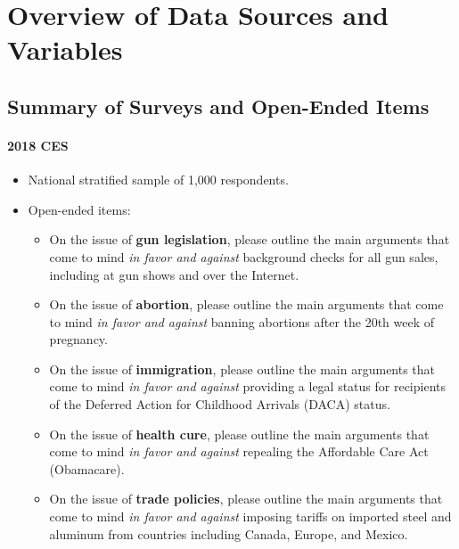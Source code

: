 \section{Overview of Data Sources and Variables}\label{app:variables}

\subsection{Summary of Surveys and Open-Ended Items}

\paragraph{2018 CES}

\begin{itemize}
	\item National stratified sample of 1,000 respondents.
	\item Open-ended items:
	\begin{itemize}
		\item On the issue of \textbf{gun legislation}, please outline the main arguments that come to mind \textit{in favor and against} background checks for all gun sales, including at gun shows and over the Internet.
		\item On the issue of \textbf{abortion}, please outline the main arguments that come to mind \textit{in favor and against} banning abortions after the 20th week of pregnancy.
		\item On the issue of \textbf{immigration}, please outline the main arguments that come to mind \textit{in favor and against} providing a legal status for recipients of the Deferred Action for Childhood Arrivals (DACA) status.
		\item On the issue of \textbf{health cure}, please outline the main arguments that come to mind \textit{in favor and against} repealing the Affordable Care Act (Obamacare).
		\item On the issue of \textbf{trade policies}, please outline the main arguments that come to mind \textit{in favor and against} imposing tariffs on imported steel and aluminum from countries including Canada, Europe, and Mexico.
	\end{itemize}
\end{itemize}




